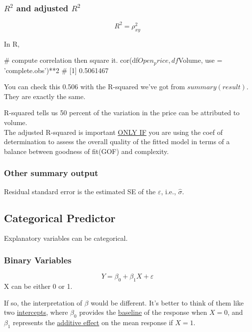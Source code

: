 \documentclass[12pt]{article}
\begin{document}
\subsubsection{$ R^{2} $ and adjusted $ R^{2} $}

\begin{equation*}
R^{2} = \rho_{xy}^{2}
\end{equation*}

In R, 
\begin{rc}
# compute correlation then square it.
cor(df$Open_price, df$Volume, use = 'complete.obs')**2
# [1] 0.5061467
\end{rc}


You can check this 0.506 with the R-squared we've got from 
$ summary(result) $. They are exactly the same.



R-squared tells us 50 percent of the variation in the price can be 
attributed to volume.\\

The adjusted R-squared is important {\underline {ONLY IF}} you are
using the coef of determination to assess the overall quality of the
fitted model in terms of a balance between goodness of fit(GOF) and
complexity.



\subsubsection{Other summary output}
Residual standard error is the estimated SE of the $ \varepsilon $,
i.e., $  \widehat{\sigma} $.





\subsection{Categorical Predictor}

Explanatory variables can be categorical.

\subsubsection{Binary Variables}

\begin{equation*}
Y = \beta_0 + \beta_1 X + \varepsilon
\end{equation*}
X can be either 0 or 1.

If so, the interpretation of $ \beta $ would be different.
It's better to think of them like two {\underline {intercepts}},
where $ \beta_0 $ provides the {\underline {baseline}} of the response
when $ X = 0 $, and $ \beta_1 $ represents the {\underline {additive
effect}} on the mean response if $ X = 1 $.
\end{document}
